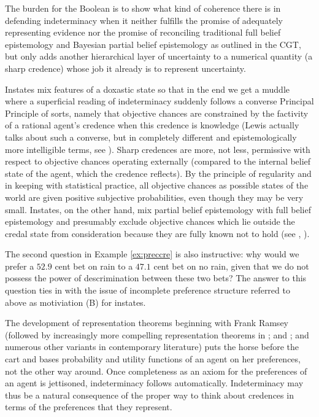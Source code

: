\documentclass[11pt]{article}
\begin{document}
The burden for the Boolean is to show what kind of coherence there is
in defending indeterminacy when it neither fulfills the promise of
adequately representing evidence nor the promise of reconciling
traditional full belief  epistemology and Bayesian
partial belief epistemology as outlined in the CGT, but only adds
another hierarchical layer of uncertainty to a numerical quantity (a
sharp credence) whose job it already is to represent
uncertainty.

Instates mix features of a doxastic state so that in the end we get a
muddle where a superficial reading of indeterminacy suddenly follows a
converse Principal Principle of sorts, namely that objective chances
are constrained by the factivity of a rational agent's credence when
this credence is knowledge (Lewis actually talks about such a
converse, but in completely different and epistemologically more
intelligible terms, see ). Sharp credences are
more, not less, permissive with respect to objective chances operating
externally (compared to the internal belief state of the agent, which
the credence reflects). By the principle of regularity and in keeping
with statistical practice, all objective chances as possible states of
the world are given positive subjective probabilities, even though
they may be very small. Instates, on the other hand, mix partial
belief epistemology with full belief epistemology and presumably
exclude objective chances which lie outside the credal state from
consideration because they are fully known not to hold (see
, ).

The second question in Example \ref{ex:preccre} is also instructive:
why would we prefer a $52.9$ cent bet on rain to a $47.1$ cent bet on
no rain, given that we do not possess the power of descrimination
between these two bets? The answer to this question ties in with the
issue of incomplete preference structure referred to above as
motiviation (B) for instates.

The development of representation theorems beginning with Frank Ramsey
(followed by increasingly more compelling representation theorems in
; and ; and numerous other
variants in contemporary literature) puts the horse before the cart
and bases probability and utility functions of an agent on her
preferences, not the other way around. Once completeness as an axiom
for the preferences of an agent is jettisoned, indeterminacy follows
automatically. Indeterminacy may thus be a natural consequence of the
proper way to think about credences in terms of the preferences that
they represent.
\end{document}
